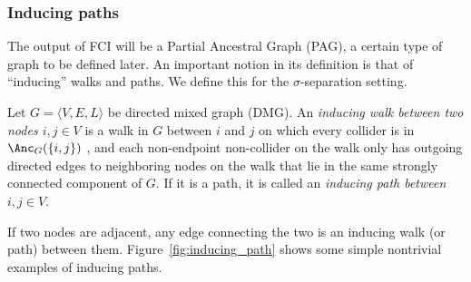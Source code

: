 \subsubsection{Inducing paths}

The output of FCI will be a Partial Ancestral Graph (PAG), a certain type of graph to be defined later. 
An important notion in its definition is that of ``inducing'' walks and paths.
We define this for the $\sigma$-separation setting.
\begin{Def}\label{def:inducing_path}
Let $G = \langle V, E, L \rangle$ be directed mixed graph (DMG). 
An \emph{inducing walk between two nodes $i,j \in V$} is a walk in $G$ between $i$ and $j$ on which every 
  collider is in $\Anc_{G}(\{i,j\})$ , and each non-endpoint non-collider on the walk only has outgoing directed edges to neighboring nodes on the walk that lie in the same strongly connected component of $G$.
  If it is a path, it is called an \emph{inducing path between $i,j \in V$}.
\end{Def}
If two nodes are adjacent, any edge connecting the two is an inducing walk (or path) between them.
Figure~\ref{fig:inducing_path} shows some simple nontrivial examples of inducing paths.

